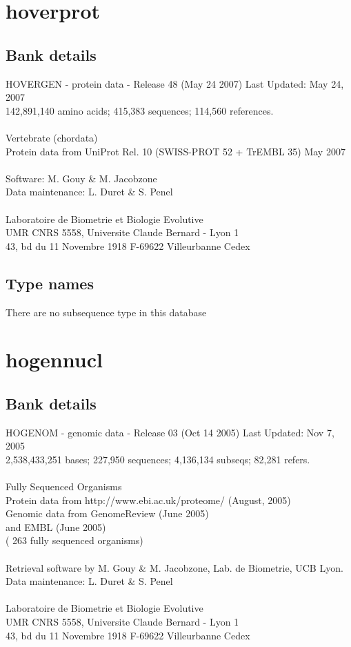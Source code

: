 \documentclass{article}
\begin{document}
\begin{Schunk}
\section{ hoverprot }
\subsection{Bank details}
HOVERGEN - protein data - Release 48 (May 24 2007) Last Updated: May 24, 2007\\
142,891,140 amino acids; 415,383 sequences; 114,560 references.\\
\\
Vertebrate (chordata)	\\
Protein data from UniProt Rel. 10 (SWISS-PROT 52 + TrEMBL 35) May 2007\\
\\
Software: M. Gouy \& M. Jacobzone\\
Data maintenance: L. Duret \& S. Penel\\
\\
Laboratoire de Biometrie et Biologie Evolutive\\
UMR CNRS 5558, Universite Claude Bernard - Lyon 1\\
43, bd du 11 Novembre 1918 F-69622 Villeurbanne Cedex\\


\subsection{Type names}
There are no subsequence type in this database
\section{ hogennucl }
\subsection{Bank details}
HOGENOM - genomic data - Release 03 (Oct 14 2005) Last Updated: Nov  7, 2005\\
2,538,433,251 bases; 227,950 sequences; 4,136,134 subseqs; 82,281 refers.\\
\\
Fully Sequenced Organisms\\
Protein data from http://www.ebi.ac.uk/proteome/ (August, 2005)\\
Genomic data from GenomeReview  (June 2005)\\
and  EMBL (June 2005)\\
( 263 fully sequenced organisms)\\
\\
Retrieval software by M. Gouy \& M. Jacobzone, Lab. de Biometrie, UCB Lyon.\\
Data maintenance: L. Duret \& S. Penel\\
\\
Laboratoire de Biometrie et Biologie Evolutive\\
UMR CNRS 5558, Universite Claude Bernard - Lyon 1\\
43, bd du 11 Novembre 1918 F-69622 Villeurbanne Cedex\\



\end{Schunk}
\end{document}
